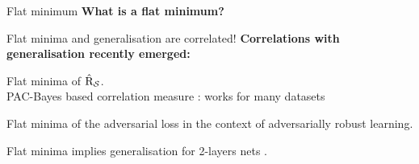 \documentclass{presentation}
\begin{document}
\begin{xframe}{Flat minimum}
    \textbf{What is a flat minimum?}
    \\
\end{xframe}


\begin{xframe}{Flat minima and generalisation are correlated!}
    \textbf{Correlations with generalisation recently emerged:}
    \vspace{0.5cm}
    \begin{xitemize}
        \item Flat minima of $\hat{\text{R}}_{\mathcal{S}}$.\\ PAC-Bayes based correlation measure : works for many datasets \citep{neyshabur2017explor,jiang2020fantastic,dziugaite2020search}
        \vspace{0.5cm}
        \item Flat minima of the adversarial loss in the context of adversarially robust learning. \citep{Stutz2021}
        \vspace{0.5cm}
        \item Flat minima implies generalisation for 2-layers nets \citep{wen2023sharpness}.
         
    \end{xitemize}
    \vspace{0.7cm}

    
\end{xframe}
\end{document}
